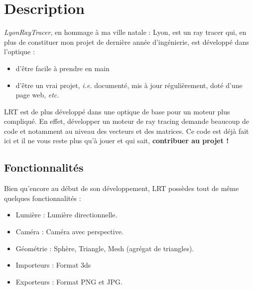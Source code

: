 \section{Description}
\textsl{LyonRayTracer}, en hommage à ma ville natale : Lyon, est un ray tracer
qui, en plus de constituer mon projet de dernière année d'ingénierie, est
développé dans l'optique :
\begin{itemize}
  \item d'être facile à prendre en main
  \item d'être un vrai projet, \textsl{i.e.} documenté, mis à jour
  régulièrement, doté d'une page web, \textsl{etc.}
\end{itemize}

LRT est de plus développé dans une optique de base pour un moteur plus
compliqué. En effet, développer un moteur de ray tracing demande beaucoup de
code  et notamment au niveau des vecteurs et des matrices.
Ce code est déjà fait ici et il ne vous reste plus qu'à jouer et qui sait,
\textbf{contribuer au projet !}

\subsection{Fonctionnalités}
Bien qu'encore au début de son développement, LRT possèdes tout de même
quelques fonctionnalités :
\begin{itemize}
  \item Lumière : Lumière directionnelle.
  \item Caméra : Caméra avec perspective.
  \item Géométrie : Sphère, Triangle, Mesh (agrégat de triangles).
  \item Importeurs : Format 3ds
  \item Exporteurs : Format PNG et JPG.
\end{itemize}
